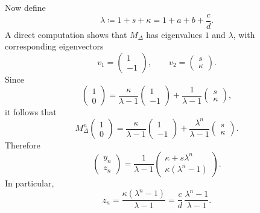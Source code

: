 \documentclass[superscriptaddress,amsmath,amssymb,aps,pra,letterpaper,tightenlines,notitlepages,12pt]{revtex4-2}
\begin{document}
Now define
\begin{equation}
\lambda\coloneqq 1+s+\kappa=1+a+b+\frac cd.
\end{equation}
A direct computation shows that $M_\Delta$ has eigenvalues $1$ and $\lambda$, with corresponding eigenvectors
\begin{equation}
v_1=
\begin{pmatrix}
1\\ -1
\end{pmatrix},
\qquad
v_2=
\begin{pmatrix}
s\\ \kappa
\end{pmatrix}.
\end{equation}
Since
\begin{equation}
\begin{pmatrix}
1\\ 0
\end{pmatrix}
= \frac{\kappa}{\lambda-1}
\begin{pmatrix}
1\\ -1
\end{pmatrix}
+ \frac{1}{\lambda-1}
\begin{pmatrix}
s\\ \kappa
\end{pmatrix},
\end{equation}
it follows that
\begin{equation}
M_\Delta^n
\begin{pmatrix}
1\\ 0
\end{pmatrix}
= \frac{\kappa}{\lambda-1}
\begin{pmatrix}
1\\ -1
\end{pmatrix}
+ \frac{\lambda^n}{\lambda-1}
\begin{pmatrix}
s\\ \kappa
\end{pmatrix}.
\end{equation}
Therefore
\begin{equation}
\begin{pmatrix}
y_n\\ z_n
\end{pmatrix}
= \frac{1}{\lambda-1}
\begin{pmatrix}
\kappa+s\lambda^n\\[1mm]
\kappa(\lambda^n-1)
\end{pmatrix}.
\label{eq:yn_zn_exact}
\end{equation}
In particular,
\begin{equation}
z_n = \frac{\kappa(\lambda^n-1)}{\lambda-1}
= \frac{c}{d}\,\frac{\lambda^n-1}{\lambda-1}.
\label{eq:z_rec_final}
\end{equation}
\end{document}
